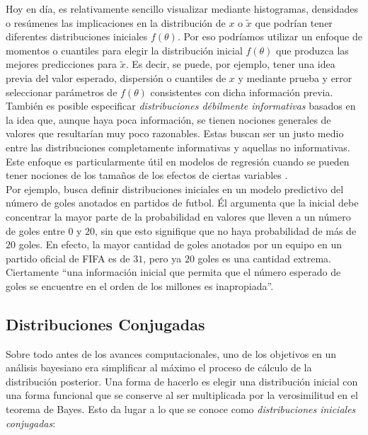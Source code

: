 Hoy en día, es relativamente sencillo visualizar mediante histogramas, densidades o resúmenes las implicaciones en la distribución de $x$ o $\tilde{x}$ que podrían tener diferentes distribuciones iniciales $f(\theta)$. Por eso podríamos utilizar un enfoque de momentos o cuantiles para elegir la distribución inicial $f(\theta)$ que produzca las mejores predicciones para $\tilde{x}$. Es decir, se puede, por ejemplo, tener una idea previa del valor esperado, dispersión o cuantiles de $x$ y mediante prueba y error seleccionar parámetros de $f(\theta)$ consistentes con dicha información previa.\\

También es posible especificar \textit{distribuciones débilmente informativas} basados en la idea que, aunque haya poca información, se tienen nociones generales de valores que resultarían muy poco razonables. Estas buscan ser un justo medio entre las distribuciones completamente informativas y aquellas no informativas. Este enfoque es particularmente útil en modelos de regresión cuando se pueden tener nociones de los tamaños de los efectos de ciertas variables \parencite{Gelman13}.\\ 

Por ejemplo, \textcite{Regueiro12} busca definir distribuciones iniciales en un modelo predictivo del número de goles anotados en partidos de futbol. Él argumenta que la inicial debe concentrar la mayor parte de la probabilidad en valores que lleven a un número de goles entre $0$ y $20$, sin que esto signifique que no haya probabilidad de más de $20$ goles. En efecto, la mayor cantidad de goles anotados por un equipo en un partido oficial de FIFA es de $31$, pero ya $20$ goles es una cantidad extrema. Ciertamente ``una información inicial que permita que el número esperado de goles se encuentre en el orden de los millones es inapropiada''. 


\subsection{Distribuciones Conjugadas}

Sobre todo antes de los avances computacionales, uno de los objetivos en un análisis bayesiano era simplificar al máximo el proceso de cálculo de la distribución posterior. Una forma de hacerlo es elegir una distribución inicial con una forma funcional que se conserve al ser multiplicada por la verosimilitud en el teorema de Bayes. Esto da lugar a lo que se conoce como \textit{distribuciones iniciales conjugadas}: 

